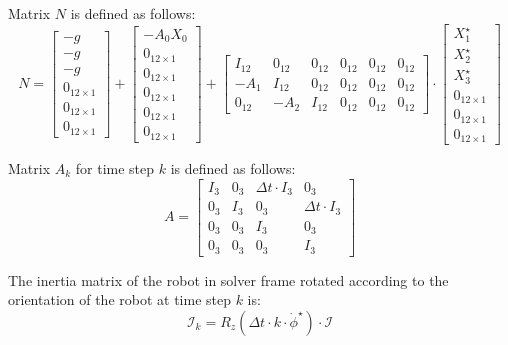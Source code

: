 \documentclass[a4paper,11pt]{article}
\begin{document}
Matrix $N$ is defined as follows:
\begin{equation}
N = \begin{bmatrix} -g \\ -g \\ -g \\ 0_{12 \times 1} \\ 0_{12 \times 1} \\ 0_{12 \times 1} \end{bmatrix} + \begin{bmatrix} -A_0 X_0 \\ 0_{12 \times 1} \\ 0_{12 \times 1} \\ 0_{12 \times 1} \\ 0_{12 \times 1} \\ 0_{12 \times 1}  \end{bmatrix} + \begin{bmatrix} I_{12} & 0_{12} & 0_{12} & 0_{12} & 0_{12} & 0_{12}\\ -A_1 & I_{12} & 0_{12} & 0_{12} & 0_{12} & 0_{12} \\ 0_{12} & -A_2 & I_{12} & 0_{12} & 0_{12} & 0_{12}\end{bmatrix} \cdot \begin{bmatrix} X_1^\star \\ X_2^\star \\ X_3^\star \\ 0_{12 \times 1} \\ 0_{12 \times 1} \\ 0_{12 \times 1}  \end{bmatrix} 
\end{equation}

Matrix $A_k$ for time step $k$ is defined as follows:
\begin{equation}
A = \begin{bmatrix} 
I_3 & 0_3 & \Delta t \cdot I_3 & 0_3 \\
0_3 & I_3 & 0_3 & \Delta t \cdot I_3 \\
0_3 & 0_3 & I_3 & 0_3 \\
0_3 & 0_3 & 0_3 & I_3
\end{bmatrix}
\end{equation}


The inertia matrix of the robot in solver frame rotated according to the orientation of the robot at time step $k$ is:
\begin{equation}
\mathcal{I}_k = R_z(\Delta t \cdot k \cdot \dot \phi^\star) \cdot \mathcal{I}
\end{equation}
\end{document}
